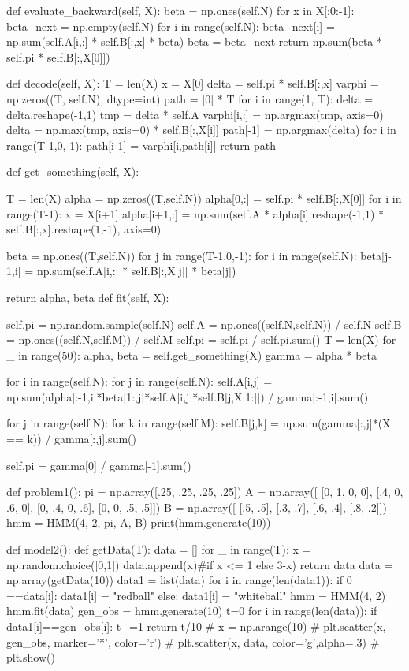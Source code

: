 \documentclass[a4paper,12pt]{ctexart}     %
\begin{document}
\begin{appendix}
\begin{python}
	
	def evaluate_backward(self, X):
		beta = np.ones(self.N)
		for x in X[:0:-1]:
			beta_next = np.empty(self.N)
		for i in range(self.N):
			beta_next[i] = np.sum(self.A[i,:] * self.B[:,x] * beta)
		beta = beta_next
		return np.sum(beta * self.pi * self.B[:,X[0]])
		
	def decode(self, X):
		T = len(X) 
		x = X[0]
		delta = self.pi * self.B[:,x]
		varphi = np.zeros((T, self.N), dtype=int)
		path = [0] * T
		for i in range(1, T):
			delta = delta.reshape(-1,1)    
			tmp = delta * self.A
			varphi[i,:] = np.argmax(tmp, axis=0)
			delta = np.max(tmp, axis=0) * self.B[:,X[i]]
		path[-1] = np.argmax(delta)
		for i in range(T-1,0,-1):
			path[i-1] = varphi[i,path[i]]
		return path
	
	def get_something(self, X):
		
		T = len(X)
		alpha = np.zeros((T,self.N))
		alpha[0,:] = self.pi * self.B[:,X[0]]
		for i in range(T-1):
			x = X[i+1]
			alpha[i+1,:] = np.sum(self.A * alpha[i].reshape(-1,1) * self.B[:,x].reshape(1,-1), axis=0)
		
		beta = np.ones((T,self.N))
		for j in range(T-1,0,-1):
			for i in range(self.N):
				beta[j-1,i] = np.sum(self.A[i,:] * self.B[:,X[j]] * beta[j])
		
		return alpha, beta
	def fit(self, X):
	
		self.pi = np.random.sample(self.N)
		self.A = np.ones((self.N,self.N)) / self.N
		self.B = np.ones((self.N,self.M)) / self.M
		self.pi = self.pi / self.pi.sum()
		T = len(X)
		for _ in range(50):
			alpha, beta = self.get_something(X)
			gamma = alpha * beta
		
		for i in range(self.N):
			for j in range(self.N):
				self.A[i,j] = np.sum(alpha[:-1,i]*beta[1:,j]*self.A[i,j]*self.B[j,X[1:]]) / gamma[:-1,i].sum()
		
		for j in range(self.N):
			for k in range(self.M):
				self.B[j,k] = np.sum(gamma[:,j]*(X == k)) / gamma[:,j].sum()
		
		self.pi = gamma[0] / gamma[-1].sum()



def problem1():
	pi = np.array([.25, .25, .25, .25])
	A = np.array([
	[0,  1,  0, 0],
	[.4, 0, .6, 0],
	[0, .4, 0, .6],
	[0, 0, .5, .5]])
	B = np.array([
	[.5, .5],
	[.3, .7],
	[.6, .4],
	[.8, .2]])
	hmm = HMM(4, 2, pi, A, B)
	print(hmm.generate(10))  


def model2():
	def getData(T):   
		data = []
		for _ in range(T):
			x = np.random.choice([0,1])
			data.append(x)#if x <= 1 else 3-x)
		return data
	data = np.array(getData(10))
	data1 = list(data)
	for i in range(len(data1)):
		if 0 ==data[i]:
			data1[i] = "redball"
		else:
			data1[i] = "whiteball"
	hmm = HMM(4, 2)
	hmm.fit(data)               
	gen_obs = hmm.generate(10) 
	t=0
	for i in range(len(data)):
		if data1[i]==gen_obs[i]:
			t+=1
	return t/10
	# x = np.arange(10)
	# plt.scatter(x, gen_obs, marker='*', color='r')
	# plt.scatter(x, data, color='g',alpha=.3)
	# plt.show()
	

\end{python}
\end{appendix}
\end{document}
